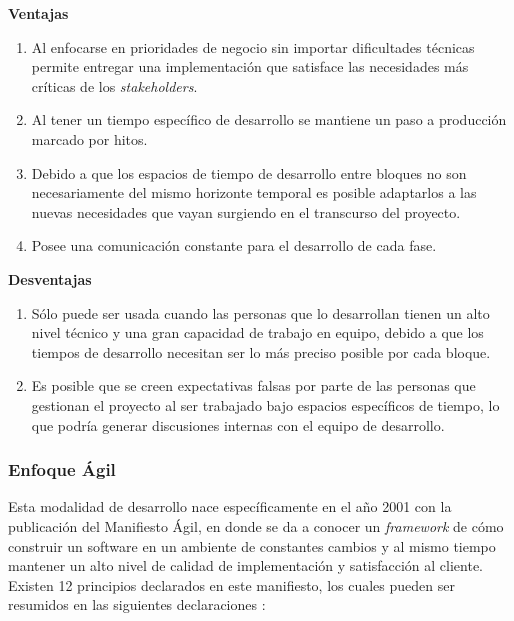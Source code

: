 \textbf{Ventajas}
\begin{enumerate}
  \item Al enfocarse en prioridades de negocio sin importar dificultades técnicas permite entregar una implementación que satisface las necesidades más críticas de los \textit{stakeholders}.
  \item Al tener un tiempo específico de desarrollo se mantiene un paso a producción marcado por hitos.
  \item Debido a que los espacios de tiempo de desarrollo entre bloques no son necesariamente del mismo horizonte temporal es posible adaptarlos a las nuevas necesidades que vayan surgiendo en el transcurso del proyecto.
  \item Posee una comunicación constante para el desarrollo de cada fase.
\end{enumerate}

\textbf{Desventajas}
\begin{enumerate}
  \item Sólo puede ser usada cuando las personas que lo desarrollan tienen un alto nivel técnico y una gran capacidad de trabajo en equipo, debido a que los tiempos de desarrollo necesitan ser lo más preciso posible por cada bloque.
  \item Es posible que se creen expectativas falsas por parte de las personas que gestionan el proyecto al ser trabajado bajo espacios específicos de tiempo, lo que podría generar discusiones internas con el equipo de desarrollo.
\end{enumerate}

\subsubsection{Enfoque Ágil \label{sec:incremental_model}}

Esta modalidad de desarrollo nace específicamente en el año 2001 con la publicación del Manifiesto Ágil, en donde se da a conocer un \textit{framework} de cómo construir un software en un ambiente de constantes cambios y al mismo tiempo mantener un alto nivel de calidad de implementación y satisfacción al cliente. Existen 12 principios declarados en este manifiesto, los cuales pueden ser resumidos en las siguientes declaraciones \cite{agile}:

